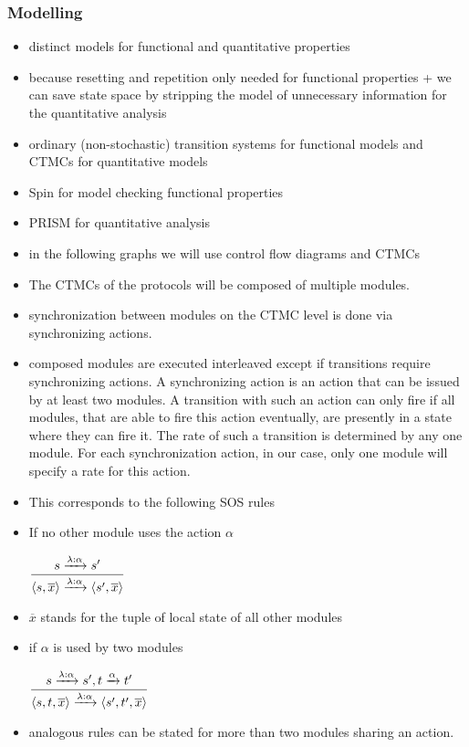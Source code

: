 \documentclass[a4paper, 10pt]{article}
\begin{document}
\subsubsection{Modelling} %
\label{sssec:analysis-modelchecking-modelling}
\begin{itemize}
	\item distinct models for functional and quantitative properties
	\item because resetting and repetition only needed for functional properties + we can save state space by stripping the model of unnecessary information for the quantitative analysis
	\item ordinary (non-stochastic) transition systems for functional models and CTMCs for quantitative models
	\item Spin\cite{spin, hol97} for model checking functional properties
	\item PRISM\cite{prism, knp09} for quantitative analysis
	\item in the following graphs we will use control flow diagrams and CTMCs
	\item The CTMCs of the protocols will be composed of multiple modules.
	\item synchronization between modules on the CTMC level is done via synchronizing actions.
	\item composed modules are executed interleaved except if transitions require synchronizing actions. A synchronizing action is an action that can be issued by at least two modules. A transition with such an action can only fire if all modules, that are able to fire this action eventually, are presently in a state where they can fire it. The rate of such a transition is determined by any one module. For each synchronization action, in our case, only one module will specify a rate for this action.
	\item This corresponds to the following SOS rules
	\item If no other module uses the action $\alpha$
		\begin{center}
			$\mathlarger{\frac{s \xrightarrow{\lambda : \alpha} s'}{\langle s , \overline{x} \rangle \xrightarrow{\lambda : \alpha} \langle s', \overline{x} \rangle}}$
		\end{center}
	\item $\overline{x}$ stands for the tuple of local state of all other modules
	\item if $\alpha$ is used by two modules
		\begin{center}
			$\mathlarger{\frac{s \xrightarrow{\lambda : \alpha} s', t \xrightarrow{\alpha} t'}{\langle s, t , \overline{x} \rangle \xrightarrow{\lambda : \alpha} \langle s', t', \overline{x} \rangle}}$
		\end{center}
	\item analogous rules can be stated for more than two modules sharing an action.
\end{itemize}
\end{document}
